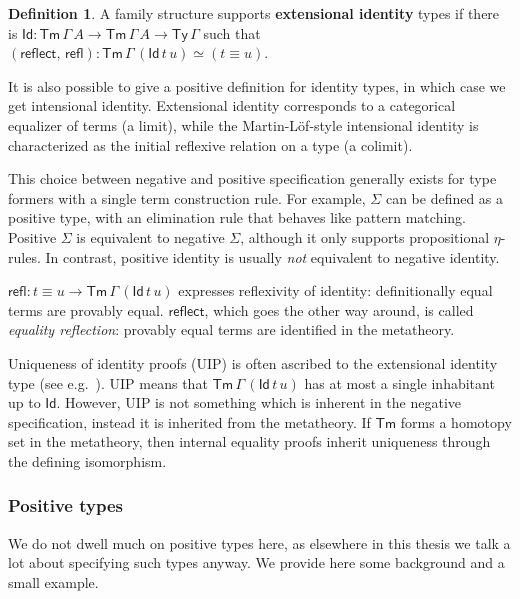 \documentclass[12pt,a4paper,twoside,openany]{book}
\theoremstyle{remark}
\theoremstyle{definition}
\newtheorem{mydefinition}{Definition}
\theoremstyle{theorem}
\newcommand{\refl}{\mathsf{refl}}
\newcommand{\reflect}{\mathsf{reflect}}
\newcommand{\Tm}{\mathsf{Tm}}
\newcommand{\Ty}{\mathsf{Ty}}
\newcommand{\Id}{\mathsf{Id}}
\begin{document}
\begin{mydefinition}
A family structure supports \textbf{extensional identity} types if there is $\Id
: \Tm\,\Gamma\,A \to \Tm\,\Gamma\,A \to \Ty\,\Gamma$ such that
$(\reflect,\,\refl) : \Tm\,\Gamma\,(\Id\,t\,u) \simeq (t \equiv u)$.
\end{mydefinition}

It is also possible to give a positive definition for identity types, in which
case we get intensional identity. Extensional identity corresponds to a
categorical equalizer of terms (a limit), while the Martin-Löf-style intensional
identity is characterized as the initial reflexive relation on a type (a
colimit).

This choice between negative and positive specification generally exists for
type formers with a single term construction rule. For example, $\Sigma$ can be
defined as a positive type, with an elimination rule that behaves like pattern
matching. Positive $\Sigma$ is equivalent to negative $\Sigma$, although it only
supports propositional $\eta$-rules. In contrast, positive identity is usually
\emph{not} equivalent to negative identity.

$\refl : t \equiv u \to \Tm\,\Gamma\,(\Id\,t\,u)$ expresses reflexivity of
identity: definitionally equal terms are provably equal. $\reflect$, which goes
the other way around, is called \emph{equality reflection}: provably equal terms
are identified in the metatheory.

Uniqueness of identity proofs (UIP) is often ascribed to the extensional
identity type (see e.g.\ \cite{hofmann1995extensional}). UIP means that
$\Tm\,\Gamma\,(\Id\,t\,u)$ has at most a single inhabitant up to $\Id$. However,
UIP is not something which is inherent in the negative specification, instead it
is inherited from the metatheory. If $\Tm$ forms a homotopy set in the
metatheory, then internal equality proofs inherit uniqueness through the
defining isomorphism.

\subsubsection{Positive types}

We do not dwell much on positive types here, as elsewhere in this thesis we talk
a lot about specifying such types anyway. We provide here some background and
a small example.
\end{document}
